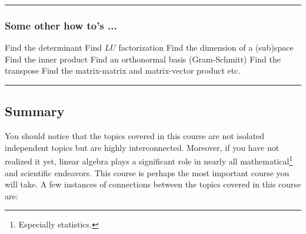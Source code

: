  
\rule[0.001in]{\textwidth}{0.00025in}




 
 
 \subsubsection*{Some other how to's ... }
 

 \begin{questions}
 \question Find the determinant
 \question Find $LU$ factorization
 \question Find the dimension of a (sub)space
\question Find the inner product
\question Find an orthonormal basis (Gram-Schmitt)
\question Find the transpose
\question Find the matrix-matrix and matrix-vector product
\question etc.
\end{questions}
 
 
\rule[0.001in]{\textwidth}{0.00025in}



 
  \subsection*{Summary}
 
 You should notice that the topics covered in this course are not isolated independent topics but are highly interconnected.  Moreover, if you have not realized it yet, linear algebra plays a significant role in nearly all mathematical\footnote{Especially statistics.}   and scientific endeavors.   This course  is perhaps the most important course you will take.  A few instances of connections between the topics covered in this course are: 
 
